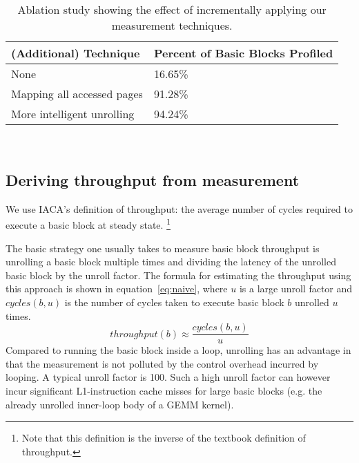 %
%

\begin{table}
\begin{tabular}{
|p{}|p{}|}
\hline
\textbf{(Additional) Technique} & \textbf{Percent of Basic Blocks Profiled} \\
\hline
None & 16.65\% \\

\hline
Mapping all accessed pages & 91.28\% \\

\hline
More intelligent unrolling & 94.24\% \\

\hline
\end{tabular}
\\
\caption{Ablation study showing the effect of incrementally applying our measurement techniques.}
\label{tab:full-ablation}
\end{table}


\subsection{Deriving throughput from measurement}
We use IACA's definition of throughput:
the average number of cycles required to execute a basic block 
at steady state.
\footnote{Note that this definition is the inverse of the textbook definition of throughput.}

The basic strategy one usually takes to measure basic block throughput
is unrolling a basic block multiple times and dividing the latency of the
unrolled basic block by the unroll factor.
The formula for estimating the throughput using this approach is shown
in equation~\ref{eq:naive}, where $u$ is a large unroll factor
and $\mathit{cycles}(b,u)$ is the number of cycles taken to execute basic block $b$
unrolled $u$ times.
\begin{equation}
\mathit{throughput}(b) \approx \frac{\mathit{cycles}(b,u)}{u}
\label{eq:naive}
\end{equation}
Compared to running the basic block inside a loop,
unrolling has an advantage in that the measurement is not polluted by
the control overhead incurred by looping.
A typical unroll factor is 100\cite{ithemal,uops}.
Such a high unroll factor can however incur significant
L1-instruction cache misses for large basic blocks
(e.g. the already unrolled inner-loop body of a GEMM kernel).

